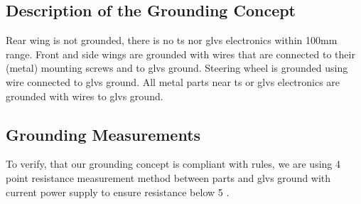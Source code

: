 \subsection{Description of the Grounding Concept}
Rear wing is not grounded, there is no \gls{ts} nor \gls{glvs} electronics within 100mm range.
Front and side wings are grounded with wires that are connected to their (metal) mounting screws and to \gls{glvs} ground.
Steering wheel is grounded using wire connected to \gls{glvs} ground.
All metal parts near \gls{ts} or \gls{glvs} electronics are grounded with wires to \gls{glvs} ground.

\subsection{Grounding Measurements}
To verify, that our grounding concept is compliant with rules, we are using 4 point resistance measurement method between parts and \gls{glvs} ground with current power supply to ensure resistance below 5 \ohm.
